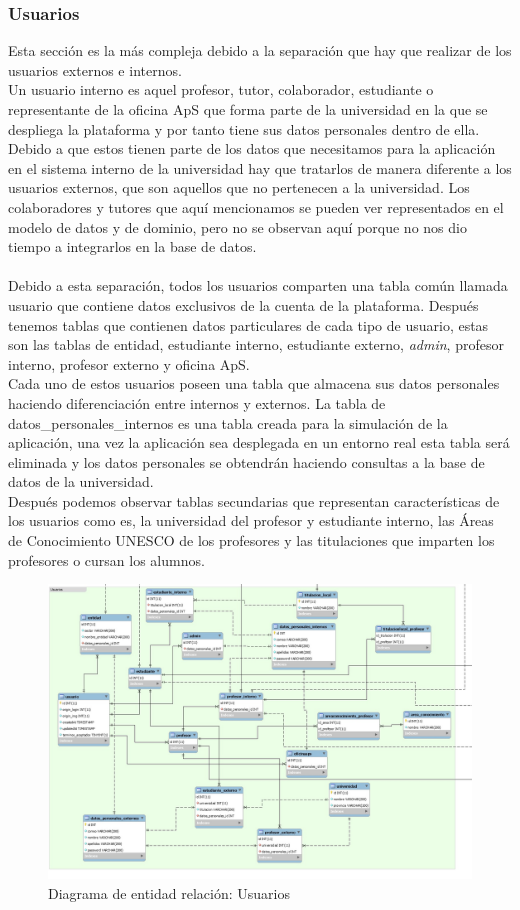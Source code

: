 \documentclass[11pt]{article}
\begin{document}
\subsubsection{Usuarios}
Esta sección es la más compleja debido a la separación que hay que realizar de los usuarios externos e internos.\\
Un usuario interno es aquel profesor, tutor, colaborador, estudiante o representante de la oficina ApS que forma parte de la universidad en la que se despliega la plataforma y por tanto tiene sus datos personales dentro de ella. Debido a que estos tienen parte de los datos que necesitamos para la aplicación en el sistema interno de la universidad hay que tratarlos de manera diferente a los usuarios externos, que son aquellos que no pertenecen a la universidad. Los colaboradores y tutores que aquí mencionamos se pueden ver representados en el modelo de datos y de dominio, pero no se observan aquí porque no nos dio tiempo a integrarlos en la base de datos.\\\\
Debido a esta separación, todos los usuarios comparten una tabla común llamada usuario que contiene datos exclusivos de la cuenta de la plataforma. Después tenemos tablas que contienen datos particulares de cada tipo de usuario, estas son las tablas de entidad, estudiante interno, estudiante externo, \textit{admin}, profesor interno, profesor externo y oficina ApS.\\
Cada uno de estos usuarios poseen una tabla que almacena sus datos personales haciendo diferenciación entre internos y externos. La tabla de datos\_personales\_internos es una tabla creada para la simulación de la aplicación, una vez la aplicación sea desplegada en un entorno real esta tabla será eliminada y los datos personales se obtendrán haciendo consultas a la base de datos de la universidad.\\
Después podemos observar tablas secundarias que representan características de los usuarios como es, la universidad del profesor y estudiante interno, las Áreas de Conocimiento UNESCO de los profesores y las titulaciones que imparten los profesores o cursan los alumnos.
\begin{figure}
	\centering
	\includegraphics[scale=0.4]{usuarios}
	\caption{Diagrama de entidad relación: Usuarios}
\end{figure}
\end{document}
